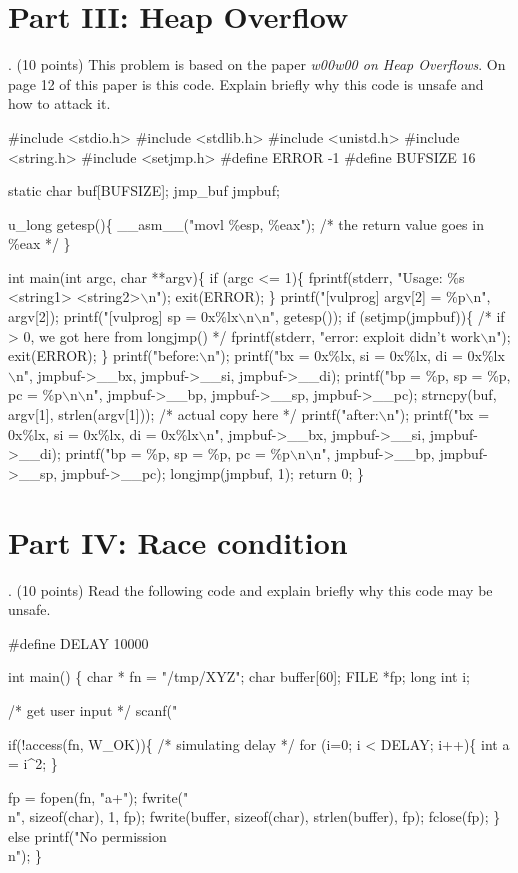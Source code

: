 \documentclass[a4paper, 10pt]{article}
\begin{document}
\newpage



\section*{Part III: Heap Overflow}
. (10 points) This problem is based on the paper
{\it w00w00 on Heap Overflows}. On page 12 of this paper is
this code. Explain briefly why this code is unsafe and how
to attack it.
\begin{code}
\#include <stdio.h>
\#include <stdlib.h>
\#include <unistd.h>
\#include <string.h>
\#include <setjmp.h>
\#define ERROR -1
\#define BUFSIZE 16

static char buf[BUFSIZE];
jmp\_buf jmpbuf;

u\_long getesp()\{
  \_\_asm\_\_("movl \%esp, \%eax"); /* the return value goes in \%eax */
\}

int main(int argc, char **argv)\{
  if (argc <= 1)\{
    fprintf(stderr, "Usage: \%s <string1> <string2>$\backslash$n");
    exit(ERROR);
  \}
  printf("[vulprog] argv[2] = \%p$\backslash$n", argv[2]);
  printf("[vulprog] sp = 0x\%lx$\backslash$n$\backslash$n", getesp());
  if (setjmp(jmpbuf))\{ /* if > 0, we got here from longjmp() */
    fprintf(stderr, "error: exploit didn't work$\backslash$n");
    exit(ERROR);
  \}
  printf("before:$\backslash$n");
  printf("bx = 0x\%lx, si = 0x\%lx, di = 0x\%lx$\backslash$n",
  jmpbuf->\_\_bx, jmpbuf->\_\_si, jmpbuf->\_\_di);
  printf("bp = \%p, sp = \%p, pc = \%p$\backslash$n$\backslash$n",
  jmpbuf->\_\_bp, jmpbuf->\_\_sp, jmpbuf->\_\_pc);
  strncpy(buf, argv[1], strlen(argv[1])); /* actual copy here */
  printf("after:$\backslash$n");
  printf("bx = 0x\%lx, si = 0x\%lx, di = 0x\%lx$\backslash$n",
  jmpbuf->\_\_bx, jmpbuf->\_\_si, jmpbuf->\_\_di);
  printf("bp = \%p, sp = \%p, pc = \%p$\backslash$n$\backslash$n",
  jmpbuf->\_\_bp, jmpbuf->\_\_sp, jmpbuf->\_\_pc);
  longjmp(jmpbuf, 1);
  return 0;
\}
\end{code}

\newpage

\section*{Part IV: Race condition}
. (10 points) Read the following code and
explain briefly why this code may be unsafe.
\begin{code}
\#define DELAY 10000

int main()
\{
    char * fn = "/tmp/XYZ";
    char buffer[60];
    FILE *fp;
    long int  i;

    /* get user input */
    scanf("%

    if(!access(fn, W\_OK))\{
      /* simulating delay */
      for (i=0; i < DELAY; i++)\{
        int a = i^2;
      \}

      fp = fopen(fn, "a+");
      fwrite("\\n", sizeof(char), 1, fp);
      fwrite(buffer, sizeof(char), strlen(buffer), fp);
      fclose(fp);
    \}
    else printf("No permission \\n");
\}
\end{code}
\end{document}
